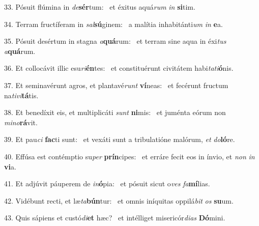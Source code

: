 33. Pósuit flúmina in \textit{de}\textbf{sér}tum: \ast\  et éxitus aquá\textit{rum} \textit{in} \textbf{si}tim.\

34. Terram fructíferam in \textit{sal}\textbf{sú}ginem: \ast\  a malítia inhabitánti\textit{um} \textit{in} \textbf{e}a.\

35. Pósuit desértum in stagna \textit{a}\textbf{quá}rum: \ast\  et terram sine aqua in éxi\textit{tus} \textit{a}\textbf{quá}rum.\

36. Et collocávit illic esu\textit{ri}\textbf{én}tes: \ast\  et constituérunt civitátem habi\textit{ta}\textit{ti}\textbf{ó}nis.\

37. Et seminavérunt agros, et plantavé\textit{runt} \textbf{ví}neas: \ast\  et fecérunt fructum na\textit{ti}\textit{vi}\textbf{tá}tis.\

38. Et benedíxit eis, et multiplicáti \textit{sunt} \textbf{ni}mis: \ast\  et juménta eórum non \textit{mi}\textit{no}\textbf{rá}vit.\

39. Et pau\textit{ci} \textbf{fac}ti sunt: \ast\  et vexáti sunt a tribulatióne malórum, \textit{et} \textit{do}\textbf{ló}re.\

40. Effúsa est contémptio su\textit{per} \textbf{prín}cipes: \ast\  et erráre fecit eos in ínvio, et \textit{non} \textit{in} \textbf{vi}a.\

41. Et adjúvit páuperem de \textit{in}\textbf{ó}pia: \ast\  et pósuit sicut o\textit{ves} \textit{fa}\textbf{mí}lias.\

42. Vidébunt recti, et læ\textit{ta}\textbf{bún}tur: \ast\  et omnis iníquitas oppilá\textit{bit} \textit{os} \textbf{su}um.\

43. Quis sápiens et custó\textit{di}\textbf{et} hæc? \ast\  et intélliget misericór\textit{di}\textit{as} \textbf{Dó}mini.\

